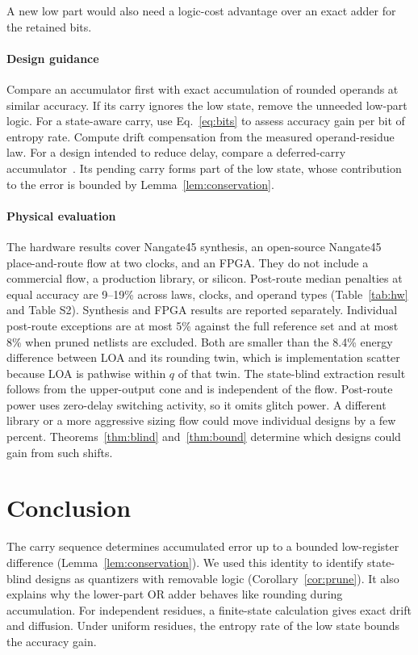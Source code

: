 \documentclass[preprint,12pt,numbers]{elsarticle}
\theoremstyle{definition}
\begin{document}
A new low part would also need a logic-cost advantage over an exact
adder for the retained bits.

\paragraph{Design guidance}
Compare an accumulator first with exact accumulation of rounded operands
at similar accuracy. If its carry ignores the low state, remove the
unneeded low-part logic. For a state-aware carry, use Eq.~\eqref{eq:bits}
to assess accuracy gain per bit of entropy rate. Compute drift
compensation from the measured operand-residue law. For a design intended
to reduce delay, compare a deferred-carry accumulator~\cite{cann_curable}.
Its pending carry forms part of the low state, whose contribution to
the error is bounded by Lemma~\ref{lem:conservation}.

\paragraph{Physical evaluation}
The hardware results cover Nangate45 synthesis, an open-source
Nangate45 place-and-route flow at two clocks, and an FPGA.
They do not include a commercial flow, a production library, or silicon.
Post-route median penalties at equal accuracy are 9--19\% across laws,
clocks, and operand types (Table~\ref{tab:hw} and Table S2).
Synthesis and FPGA results are reported separately. Individual
post-route exceptions are at most 5\% against the full
reference set and at most 8\% when pruned netlists are excluded.
Both are smaller than the 8.4\% energy difference between LOA and
its rounding twin, which is implementation scatter because LOA is
pathwise within $q$ of that twin.
The state-blind extraction result follows from the upper-output cone
and is independent of the flow. Post-route power uses zero-delay
switching activity, so it omits glitch power. A different library or
a more aggressive sizing flow could move individual designs by a few
percent. Theorems~\ref{thm:blind} and~\ref{thm:bound} determine
which designs could gain from such shifts.

\section{Conclusion}

The carry sequence determines accumulated error up to a bounded
low-register difference (Lemma~\ref{lem:conservation}).
We used this identity to identify state-blind designs as quantizers
with removable logic (Corollary~\ref{cor:prune}).
It also explains why the lower-part OR adder behaves like rounding
during accumulation. For independent residues, a finite-state
calculation gives exact drift and diffusion. Under uniform residues,
the entropy rate of the low state bounds the accuracy gain.
\end{document}
